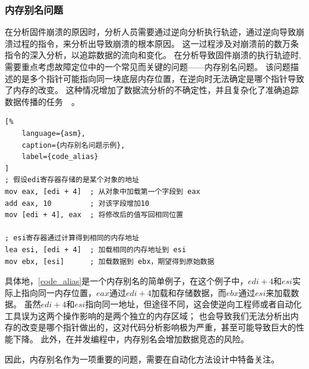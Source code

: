 \subsubsection{内存别名问题}                %
在分析固件崩溃的原因时，分析人员需要通过逆向分析执行轨迹，通过逆向导致崩溃过程的指令，来分析出导致崩溃的根本原因。
这一过程涉及对崩溃前的数万条指令的深入分析，以追踪数据的流向和变化。
在分析导致固件崩溃的执行轨迹时,需要重点考虑故障定位中的一个常见而关键的问题——内存别名问题。
该问题描述的是多个指针可能指向同一块底层内存位置，在逆向时无法确定是哪个指针导致了内存的改变。
这种情况增加了数据流分析的不确定性，并且复杂化了准确追踪数据传播的任务~\cite{REPT}~\cite{RETracer2016}。

\begin{lstlisting}[%
    language={asm},
    caption={内存别名问题示例},
    label={code_alias}
]
; 假设edi寄存器存储的是某个对象的地址
mov eax, [edi + 4]  ; 从对象中加载第一个字段到 eax
add eax, 10         ; 对该字段增加10
mov [edi + 4], eax  ; 将修改后的值写回相同位置

; esi寄存器通过计算得到相同的内存地址
lea esi, [edi + 4]  ; 加载相同的内存地址到 esi
mov ebx, [esi]      ; 加载数据到 ebx，期望得到原始数据
\end{lstlisting}

具体地，\autoref{code_alias}是一个内存别名的简单例子，在这个例子中，$edi+4$和$esi$实际上指向同一内存位置，$eax$通过$edi + 4$加载和存储数据，而$ebx$通过$esi$来加载数据。
虽然$edi+4$和$esi$指向同一地址，但途径不同，这会使逆向工程师或者自动化工具误为这两个操作影响的是两个独立的内存区域；
也会导致我们无法分析出内存的改变是哪个指针做出的，这对代码分析影响极为严重，甚至可能导致巨大的性能下降。
此外，在并发编程中，内存别名会增加数据竞态的风险。

因此，内存别名作为一项重要的问题，需要在自动化方法设计中特备关注。

